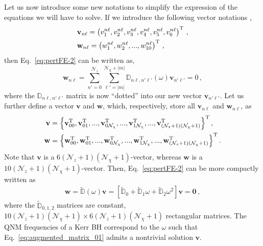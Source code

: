 \documentclass[aps,prx,amsmath,floats,floatfix,twocolumn,
  superscriptaddress,nofootinbib,showpacs]{revtex4-1}
\begin{document}
Let us now introduce some new notations to simplify the expression of the equations we will have to solve. If we introduce the following vector notations \cite{Chung:2023zdq}, 
\begin{equation}\label{eq:vector_arrangement}
\begin{split}
& \textbf{v}_{n \ell} = \left( v_1^{n \ell}, v_2^{n \ell}, v_3^{n \ell}, v_4^{n \ell}, v_5^{n \ell}, v_6^{n \ell} \right)^{\rm T} \,, \\
& \textbf{w}_{n \ell} = \left( w_1^{n \ell}, w_2^{n \ell}, ..., w_{10}^{n \ell} \right)^{\rm T} \,,
\end{split}
\end{equation}
then Eq.~\eqref{eq:pertFE-2} can be written as, 
\begin{equation}\label{eq:vector_equations}
\textbf{w}_{n \ell} = \sum_{n'=0}^{\mathcal{N}_z} \sum_{\ell'=|m|}^{\mathcal{N}_{\chi}+|m|} \mathbb{D}_{n \ell, n' \ell'}(\omega) \textbf{v}_{n' \ell'} = 0\,,
\end{equation}
where the $\mathbb{D}_{n \ell, n' \ell'}$ matrix is now ``dotted'' into our new vector $\textbf{v}_{n' \ell'}$. 
Let us further define a vector $\textbf{v}$ and $\textbf{w}$, which, respectively, store all $\textbf{v}_{n \ell}$ and $\textbf{w}_{n \ell}$, as
\begin{equation}
\begin{split}
\textbf{v} & = \left\{ \textbf{v}_{00}^{\rm T}, \textbf{v}_{01}^{\rm T}, ..., \textbf{v}_{0 \mathcal{N}_{\chi}}^{\rm T}, ..., \textbf{v}_{1 \mathcal{N}_{\chi}}^{\rm T}, ...,  \textbf{v}_{(\mathcal{N}_{z}+1)(\mathcal{N}_{\chi}+1)}^{\rm T} \right\}^{\rm T}, \\
\textbf{w} & = \left\{ \textbf{w}_{00}^{\rm T}, \textbf{w}_{01}^{\rm T}, ..., \textbf{w}_{0 \mathcal{N}_{\chi}}^{\rm T}, ..., \textbf{w}_{1 \mathcal{N}_{\chi}}^{\rm T}, ...,  \textbf{w}_{(\mathcal{N}_{z}+1)(\mathcal{N}_{\chi}+1)}^{\rm T} \right\}^{\rm T}. 
\end{split}
\end{equation}
Note that $\textbf{v}$ is a $6(\mathcal{N}_{z}+1)(\mathcal{N}_{\chi}+1)$-vector, whereas $\textbf{w}$ is a $10(\mathcal{N}_{z}+1)(\mathcal{N}_{\chi}+1)$-vector.
Then, Eq.~\eqref{eq:pertFE-2} can be more compactly written as 
\begin{equation}\label{eq:augmented_matrix_01}
\begin{split}
\textbf{w} = \tilde{\mathbb{D}} (\omega) \textbf{v} = \left[ \tilde{\mathbb{D}}_0 + \tilde{\mathbb{D}}_1 \omega + \tilde{\mathbb{D}}_2 \omega^2 \right] \textbf{v} = \textbf{0} \,,
\end{split}
\end{equation}
where the $\tilde{\mathbb{D}}_{0,1,2}$ matrices are constant, $ 10 (\mathcal{N}_z + 1)(\mathcal{N}_{\chi} + 1) \times 6 (\mathcal{N}_z + 1)(\mathcal{N}_{\chi} + 1) $ rectangular matrices.
The QNM frequencies of a Kerr BH correspond to the $\omega$ such that Eq.~\eqref{eq:augmented_matrix_01} admits a nontrivial solution $\textbf{v}$. 
\end{document}
